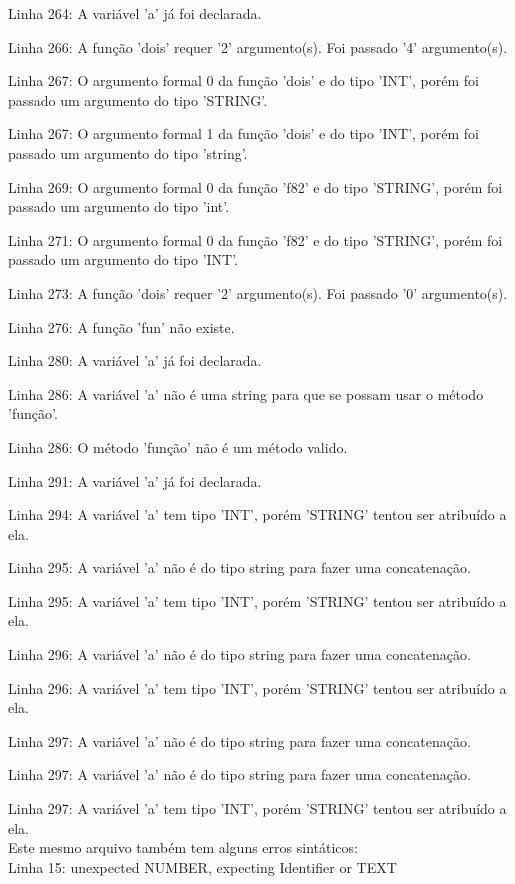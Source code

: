 \documentclass[12pt]{article}
\begin{document}
Linha 264: A variável 'a' já foi declarada.

Linha 266: A função 'dois' requer '2' argumento(s). Foi passado '4' argumento(s).

Linha 267: O argumento formal 0 da função 'dois' e do tipo 'INT', porém foi passado um argumento do tipo 'STRING'.

Linha 267: O argumento formal 1 da função 'dois' e do tipo 'INT', porém foi passado um argumento do tipo 'string'.

Linha 269: O argumento formal 0 da função 'f82' e do tipo 'STRING', porém foi passado um argumento do tipo 'int'.

Linha 271: O argumento formal 0 da função 'f82' e do tipo 'STRING', porém foi passado um argumento do tipo 'INT'.

Linha 273: A função 'dois' requer '2' argumento(s). Foi passado '0' argumento(s).

Linha 276: A função 'fun' não existe.

Linha 280: A variável 'a' já foi declarada.

Linha 286: A variável 'a' não é uma string para que se possam usar o método 'função'.

Linha 286: O método 'função' não é um método valido.

Linha 291: A variável 'a' já foi declarada.

Linha 294: A variável 'a' tem tipo 'INT', porém 'STRING' tentou ser atribuído a ela.

Linha 295: A variável 'a' não é do tipo string para fazer uma concatenação.

Linha 295: A variável 'a' tem tipo 'INT', porém 'STRING' tentou ser atribuído a ela.

Linha 296: A variável 'a' não é do tipo string para fazer uma concatenação.

Linha 296: A variável 'a' tem tipo 'INT', porém 'STRING' tentou ser atribuído a ela.

Linha 297: A variável 'a' não é do tipo string para fazer uma concatenação.

Linha 297: A variável 'a' não é do tipo string para fazer uma concatenação.

Linha 297: A variável 'a' tem tipo 'INT', porém 'STRING' tentou ser atribuído a ela.\\


Este mesmo arquivo também tem alguns erros sintáticos:\\

Linha 15: unexpected NUMBER, expecting Identifier or TEXT
\end{document}
